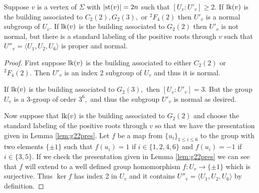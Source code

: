 \documentclass[class=book, crop=false,12 pt]{standalone}
\begin{document}
\begin{lemma}
	\label{lem:normal}
	Suppose $v$ is a vertex of $\Sigma$ with $|\mathrm{st}(v)|=2n$ such that $[U_v:U'_v]\ge 2.$ If $\mathrm{lk}(v)$ is the building associated to $C_2(2),G_2(3),$ or ${}^2F_4(2)$ then $U'_v$ is a normal subgroup of $U_v.$ If $\mathrm{lk}(v)$ is the building associated to $G_2(2)$ then $U'_v$ is not normal, but there is a standard labeling of the positive roots through $v$ such that $U''_v=\langle U_1,U_2,U_6\rangle$ is proper and normal.
\end{lemma}
\begin{proof}
	First suppose $\mathrm{lk}(v)$ is the building associated to either $C_2(2)$ or ${}^2F_4(2).$ Then $U'_v$ is an index 2 subgroup of $U_v$ and thus it is normal.

	If $\mathrm{lk}(v)$ is the building associated to $G_2(3),$ then $[U_v:U'_v]=3.$ But the group $U_v$ is a 3-group of order $3^6,$ and thus the subgroup $U'_v$ is normal as desired.
%
%

	Now suppose that $\mathrm{lk}(v)$ is the building associated to $G_2(2)$ and choose the standard labeling of the positive roots through $v$ so that we have the presentation given in Lemma \ref{lem:g22pres}. Let $f$ be a map from $\{u_i\}_{1\le i\le 6}$ to the group with two elements $\{\pm 1\}$ such that $f(u_i)=1$ if $i\in \{1,2,4,6\}$ and $f(u_i)=-1$ if $i\in \{3,5\}.$ If we check the presentation given in Lemma \ref{lem:g22pres} we can see that $f$ will extend to a well defined group homomorphism $f:U_v\to \{\pm 1\}$ which is surjective. Thus $\ker f$ has index 2 in $U_v$ and it contains $U''_v=\langle U_1,U_2,U_6\rangle$ by definition. 


\end{proof}
\end{document}
